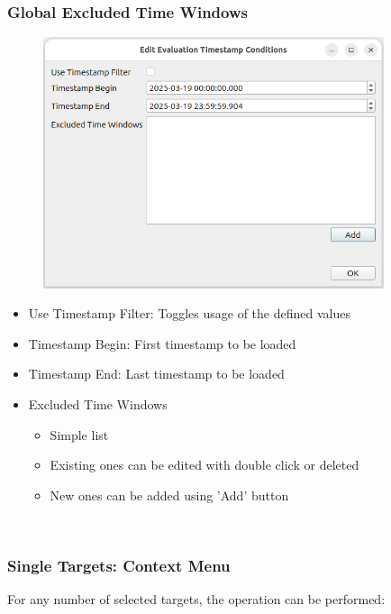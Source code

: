 \subsubsection{Global Excluded Time Windows}

\begin{figure}[H]
  \center
  \includegraphics[width=10cm,frame]{figures/eval_global_excl_tw.png}
\end{figure}

\begin{itemize}
  \item Use Timestamp Filter: Toggles usage of the defined values
  \item Timestamp Begin: First timestamp to be loaded
  \item Timestamp End: Last timestamp to be loaded
  \item Excluded Time Windows
  \begin{itemize}
  \item Simple list
  \item Existing ones can be edited with double click or deleted
  \item New ones can be added using 'Add' button
\end{itemize} 
\end{itemize} 
\ \\

\subsubsection{Single Targets: Context Menu}

For any number of selected targets, the operation can be performed:

